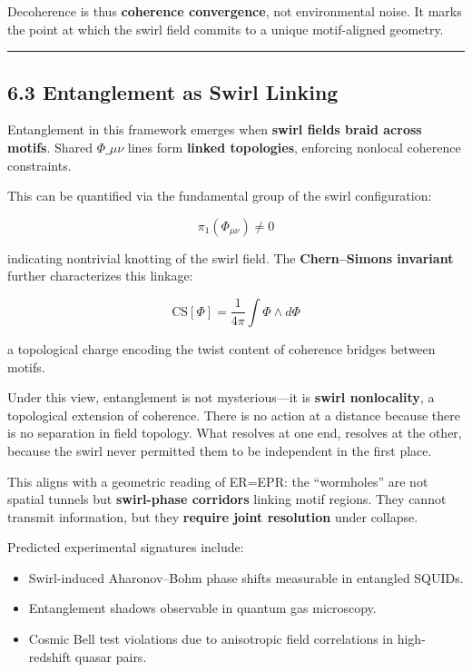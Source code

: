 \documentclass[
  11pt,
]{article}
\providecommand{\tightlist}{%
  \setlength{\itemsep}{0pt}\setlength{\parskip}{0pt}}
\begin{document}
Decoherence is thus \textbf{coherence convergence}, not environmental
noise. It marks the point at which the swirl field commits to a unique
motif-aligned geometry.

\begin{center}\rule{0.5\linewidth}{0.5pt}\end{center}

\subsection{6.3 Entanglement as Swirl
Linking}\label{entanglement-as-swirl-linking}

Entanglement in this framework emerges when \textbf{swirl fields braid
across motifs}. Shared \(\Phi\_{\mu\nu}\) lines form \textbf{linked
topologies}, enforcing nonlocal coherence constraints.

This can be quantified via the fundamental group of the swirl
configuration:

\[
\pi_1(\Phi_{\mu\nu}) \neq 0
\]

indicating nontrivial knotting of the swirl field. The
\textbf{Chern--Simons invariant} further characterizes this linkage:

\[
\text{CS}[\Phi] = \frac{1}{4\pi} \int \Phi \wedge d\Phi
\]

a topological charge encoding the twist content of coherence bridges
between motifs.

Under this view, entanglement is not mysterious---it is \textbf{swirl
nonlocality}, a topological extension of coherence. There is no action
at a distance because there is no separation in field topology. What
resolves at one end, resolves at the other, because the swirl never
permitted them to be independent in the first place.

This aligns with a geometric reading of ER=EPR: the ``wormholes'' are
not spatial tunnels but \textbf{swirl-phase corridors} linking motif
regions. They cannot transmit information, but they \textbf{require
joint resolution} under collapse.

Predicted experimental signatures include:

\begin{itemize}
\tightlist
\item
  Swirl-induced Aharonov--Bohm phase shifts measurable in entangled
  SQUIDs.
\item
  Entanglement shadows observable in quantum gas microscopy.
\item
  Cosmic Bell test violations due to anisotropic field correlations in
  high-redshift quasar pairs.
\end{itemize}
\end{document}
